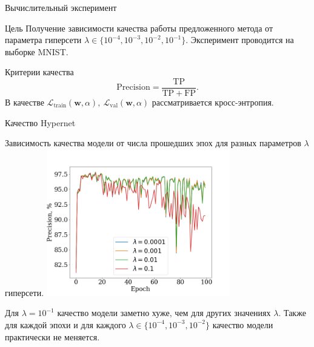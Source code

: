 \documentclass{beamer}
\begin{document}
\begin{frame}{Вычислительный эксперимент}

\begin{block}{Цель}
Получение зависимости качества работы предложенного метода от параметра гиперсети $\lambda \in \{10^{-4}, 10^{-3}, 10^{-2}, 10^{-1}\}$. Эксперимент проводится на выборке MNIST.
\end{block}

\begin{block}{Критерии качества}
 $$\mathrm{Precision} = \frac{\mathrm{TP}}{\mathrm{TP} + \mathrm{FP}}.$$
 В качестве $\mathcal{L}_\text{train}(\mathbf{w}, \alpha), ~\mathcal{L}_\text{val}(\mathbf{w}, \alpha)$ рассматривается кросс-энтропия.
\end{block}

\end{frame}

\begin{frame}{Качество Hypernet}

\begin{center}
Зависимость качества модели от числа прошедших эпох для разных параметров $\lambda$ гиперсети.
\includegraphics[width=0.6\textwidth]{main_100_exp}
\end{center}

Для $\lambda = 10^{-1}$ качество модели заметно хуже, чем для других значениях $\lambda$. Также для каждой эпохи и для каждого $\lambda \in \{10^{-4}, 10^{-3}, 10^{-2}\}$ качество модели практически не меняется.

\end{frame}
\end{document}
